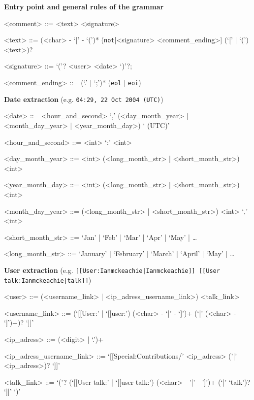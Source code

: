 \documentclass[border=0.2cm,preview]{standalone}
\begin{document}
\setlength{\grammarparsep}{0pt} %
\setlength{\grammarindent}{12em} %
\begin{minipage}{20cm}

	\textbf{Entry point and general rules of the grammar}
	\begin{grammar}
		<comment> ::= <text> <signature>

		<text> ::= (<char> - `[' - `(')*  (\texttt{not}[<signature> <comment\_ending>] (`[' | `(') <text>)?

			<signature> ::= `('? <user> <date>  `)'?;

			<comment\_ending> ::= (`.' | `;')*  (\texttt{eol} | \texttt{eoi})
		\end{grammar}

		\textbf{Date extraction} (e.g. \texttt{04:29, 22 Oct 2004 (UTC)})
		\begin{grammar}
			<date> ::= <hour\_and\_second> `,' (<day\_month\_year> | <month\_day\_year> | <year\_month\_day>)  ` (UTC)'

			<hour\_and\_second> ::= <int> `:' <int>

			<day\_month\_year> ::= <int> (<long\_month\_str> | <short\_month\_str>) <int>

			<year\_month\_day> ::= <int> (<long\_month\_str> | <short\_month\_str>) <int> 

			<month\_day\_year> ::= (<long\_month\_str> | <short\_month\_str>) <int> `,' <int> 

			<short\_month\_str> ::= `Jan' | `Feb' | `Mar' | `Apr' | `May' | \ldots 

			<long\_month\_str> ::= `January' | `February' | `March' | `April' | `May' | \ldots 
		\end{grammar}

		\textbf{User extraction} (e.g. \texttt{[[User:Ianmckeachie|Ianmckeachie]] [[User talk:Ianmckeachie|talk]]})
		\begin{grammar}
			<user> ::= (<username_link> | <ip_adress_username_link>) <talk_link>

			<username_link> ::= (`[[User:' | `[[user:') (<char>  - `|' - `]')+   (`|' (<char>  - `]')+)? `]]'

			<ip_adress> ::= (<digit> | `.')+

			<ip_adress_username_link> ::= `[[Special:Contributions/' <ip_adress> ('|' <ip_adress>)? `]]'	

			<talk_link> ::= `('? (`[[User talk:' | `[[user talk:') (<char> - '|' - ']')+ (`|' `talk')? `]]' `)'
		\end{grammar}

	\end{minipage}
	
\end{document}
